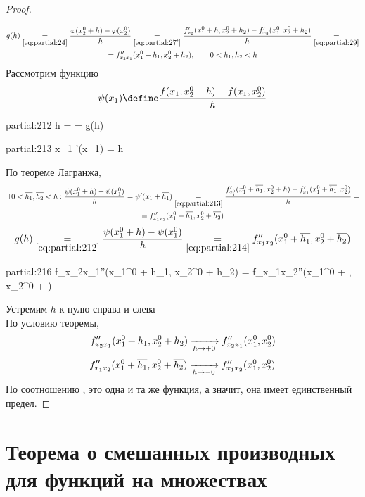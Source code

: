 \begin{proof}
\begin{multline}
	\end{multline}
	\begin{multline}\lbl{partial:210}
		g(h) \underset{\eref{partial:24}}= \frac{\vphi(x_2^0 + h) - \vphi(x_2^0)}h \underset{\eref{partial:27'}}= \frac{f_{x_2}'(x_1^0 + h, x_2^0 + h_2) - f_{x_2}'(x_1^0, x_2^0 + h_2)}h \underset{\eref{partial:29}}= \\
		= f_{x_2x_1}''(x_1^0 + h_1, x_2^0 + h_2), \qquad 0 < h_1, h_2 < h
	\end{multline}
	Рассмотрим функцию
	$$ \psi(x_1) \define \frac{f(x_1, x_2^0 + h) - f(x_1, x_2^0)}h $$
	\begin{equ}{partial:212}
		h =  = g(h)
	\end{equ}
	\begin{equ}{partial:213}
		\forall x_1 \in [x_1^0, x_1^0 + h] \quad \exist \psi'(x_1) = h
	\end{equ}
	По теореме Лагранжа,
	\begin{multline}\lbl{partial:214}
		\exist 0 < \overline{h_1}, \overline{h_2} < h : \frac{\psi(x_1^0 + h) - \psi(x_1^0)}h = \psi'(x_1 + \overline{h_1}) \underset{\eref{partial:213}}= \frac{f_{x_1^0}'(x_1^0 + \overline{h_1}, x_2^0 + h) - f_{x_1}'(x_1^0 + \overline{h_1}, x_2^0)}h = \\
		= f_{x_1x_2}''(x_1^0 + \overline{h_1}, x_2^0 + \overline{h_2})
	\end{multline}
	$$ g(h) \underset{\eref{partial:212}}= \frac{\psi(x_1^0 + h) - \psi(x_1^0)}h \underset{\eref{partial:214}}= f_{x_1x_2}''(x_1^0 + \overline{h_1}, x_2^0 + \overline{h_2}) $$
	\begin{equ}{partial:216}
		 f_{x_2x_1}''(x_1^0 + h_1, x_2^0 + h_2) = f_{x_1x_2}''(x_1^0 + , x_2^0 + )
	\end{equ}
	Устремим $ h $ к нулю справа и слева \\
	По условию теоремы,
	$$ f_{x_2x_1}''(x_1^0 + h_1, x_2^0 + h_2) \xrightarrow[h \to +0]{} f_{x_2x_1}''(x_1^0, x_2^0) $$
	$$ f_{x_1x_2}''(x_1^0 + \overline{h_1}, x_2^0 + \overline{h_2}) \xrightarrow[h \to -0]{} f_{x_1x_2}''(x_1^0, x_2^0) $$
	По соотношению , это одна и та же функция, а значит, она имеет единственный предел.
\end{proof}

\section{Теорема о смешанных производных для функций на множествах }

